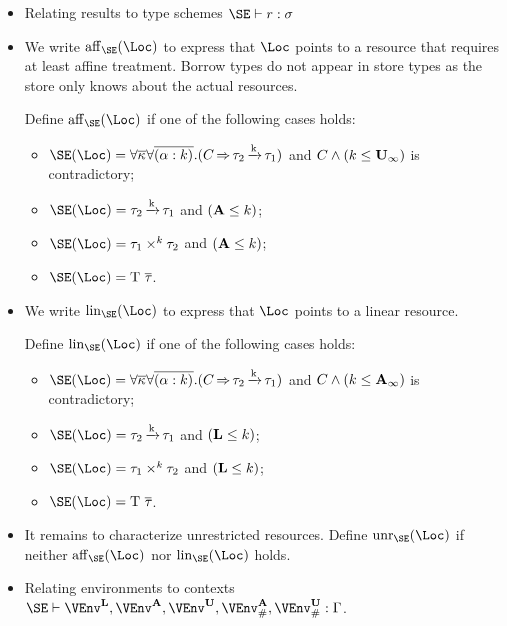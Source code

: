 \begin{itemize}
\begin{mathpar}


  \end{mathpar}
\item Relating results to type schemes $\SE \vdash r : \schm$
  \begin{mathpar}


  \end{mathpar}
\item
We write $\Affine\SE\Loc$ to express that $\Loc$ points to a resource
that requires at least affine treatment. Borrow types do not appear in
store types as the store only knows about the actual resources.

Define  $\Affine\SE\Loc$ if one of the following cases holds:
\begin{itemize}
\item $\SE (\Loc) =
  \forall\Multi\kvar\forall\Multi{\bvar{\tvar}{k}}.(\qual{C}{\tau_2\tarr{k}\tau_1})$
  and $C \wedge (k \lk \kun_\infty)$ is contradictory;
\item $\SE (\Loc) = \tau_2\tarr{k}{\tau_1}$ and $\Cleq{\kaff}{k}$;
\item $\SE (\Loc) = \tyPair[k]{\tau_1}{\tau_2}$ and $\Cleq \kaff
  k$;
\item $\SE (\Loc) = \tapp{\tcon}{\Multi\tau}$.
\end{itemize}
\item
We write $\Linear\SE\Loc$ to express that $\Loc$ points to a linear
resource.

Define  $\Linear\SE\Loc$ if one of the following cases holds:
\begin{itemize}
\item $\SE (\Loc) =
  \forall\Multi\kvar\forall\Multi{\bvar{\tvar}{k}}.(\qual{C}{\tau_2\tarr{k}\tau_1})$
  and $C \wedge (k \lk \kaff_\infty)$ is contradictory;
\item $\SE (\Loc) = \tau_2\tarr{k}{\tau_1}$ and $\Cleq{\klin}{k}$;
\item $\SE (\Loc) = \tyPair[k]{\tau_1}{\tau_2}$ and $\Cleq \klin
  k$;
\item $\SE (\Loc) = \tapp{\tcon}{\Multi\tau}$.
\end{itemize}
\item
It remains to characterize unrestricted resources.
Define $\Unrestricted\SE\Loc$ if neither $\Affine\SE\Loc$ nor
$\Linear\SE\Loc$ holds.
\item
  Relating environments to contexts\\
  $\SE \vdash \Active\VEnv, \MutableBorrows\VEnv,
\ImmutableBorrows\VEnv, \Suspended[\kaff]\VEnv, \Suspended[\kun]\VEnv : \E$.


\end{itemize}
